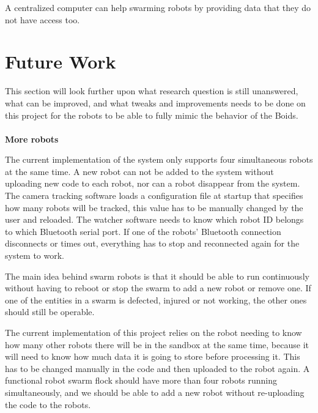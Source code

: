 A centralized computer can help swarming robots by providing data that they do not have access too.





\section{Future Work}
\label{sec:futureWork}

This section will look further upon what research question is still unanswered, what can be improved, and what tweaks and improvements needs to be done on this project for the robots to be able to fully mimic the behavior of the Boids. \\\\
\textbf{More robots}

The current implementation of the system only supports four simultaneous robots at the same time. A new robot can not be added to the system without uploading new code to each robot, nor can a robot disappear from the system. The camera tracking software loads a configuration file at startup that specifies how many robots will be tracked, this value has to be manually changed by the user and reloaded.
The watcher software needs to know which robot ID belongs to which Bluetooth serial port. If one of the robots' Bluetooth connection disconnects or times out, everything has to stop and reconnected again for the system to work.

The main idea behind swarm robots is that it should be able to run continuously without having to reboot or stop the swarm to add a new robot or remove one. If one of the entities in a swarm is defected, injured or not working, the other ones should still be operable.

The current implementation of this project relies on the robot needing to know how many other robots there will be in the sandbox at the same time, because it will need to know how much data it is going to store before processing it. This has to be changed manually in the code and then uploaded to the robot again.
A functional robot swarm flock should have more than four robots running simultaneously, and we should be able to add a new robot without re-uploading the code to the robots.

